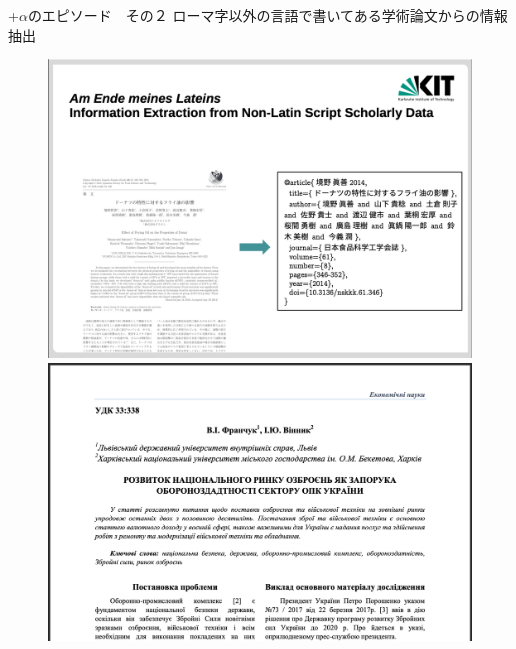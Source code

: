\documentclass[lualatex,aspectratio=169]{beamer}
\begin{document}
\begin{frame}[t]{+$\alpha$のエピソード　その２}
    ローマ字以外の言語で書いてある学術論文からの情報抽出
    \begin{figure}
        \begin{overprint}
            \begin{center}\includegraphics[height=0.45\textheight]{./img/cyr_1.png}\end{center}
            \begin{center}\includegraphics[height=0.45\textheight]{./img/cyr_2.png}\end{center}

\end{overprint}
\end{figure}
\end{frame}
\end{document}
